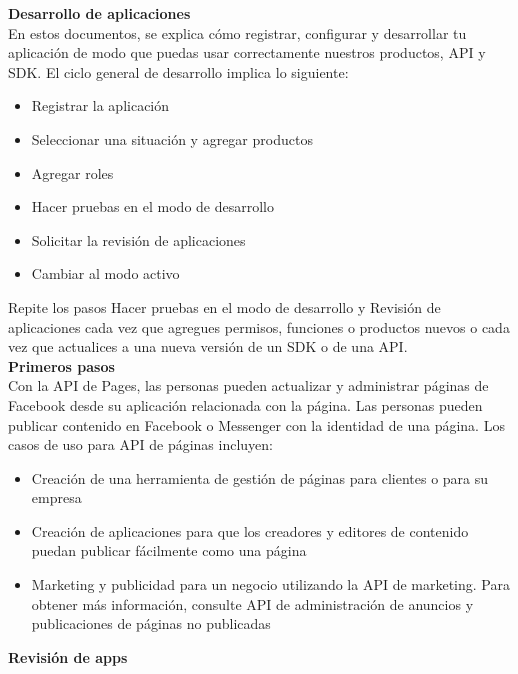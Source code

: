 	\textbf{Desarrollo de aplicaciones} \\
	
	En estos documentos, se explica cómo registrar, configurar y desarrollar tu aplicación de modo
	que puedas usar correctamente nuestros productos, API y SDK.
	El ciclo general de desarrollo implica lo siguiente:
	\begin{itemize}
		\item Registrar la aplicación
		\item Seleccionar una situación y agregar productos
		\item Agregar roles
		\item Hacer pruebas en el modo de desarrollo
		\item Solicitar la revisión de aplicaciones
		\item Cambiar al modo activo
	\end{itemize}
	\noindent Repite los pasos Hacer pruebas en el modo de desarrollo y Revisión de
	aplicaciones cada vez que agregues permisos, funciones o productos nuevos o cada vez que
	actualices a una nueva versión de un SDK o de una API.\\
	
	\textbf{Primeros pasos}\\
	Con la API de Pages, las personas pueden actualizar y administrar páginas de Facebook desde su
	aplicación relacionada con la página. Las personas pueden publicar contenido en Facebook o
	Messenger con la identidad de una página. Los casos de uso para API de páginas incluyen:
	\begin{itemize}
		\item Creación de una herramienta de gestión de páginas para clientes o para su
		empresa
		\item Creación de aplicaciones para que los creadores y editores de contenido
		puedan publicar fácilmente como una página
		\item Marketing y publicidad para un negocio utilizando la API de marketing. Para
		obtener más información, consulte API de administración de anuncios y publicaciones de
		páginas no publicadas
		
	\end{itemize}
	
	\textbf{Revisión de apps}\\ 
	
